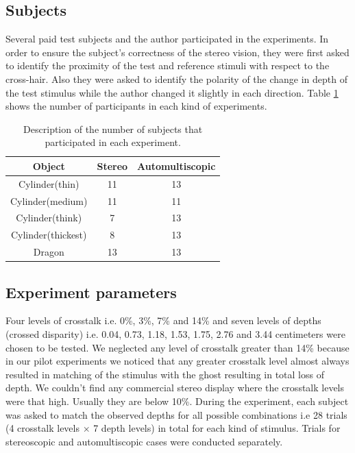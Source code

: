 \subsection{Subjects}
Several paid test subjects and the author participated in the experiments. In order to ensure the subject's correctness of the stereo vision, they were first asked to identify the proximity of the test and reference stimuli with respect to the cross-hair. Also they were asked to identify the polarity of the change in depth of the test stimulus while the author changed it slightly in each direction. Table \ref{tab:agg_subj} shows the number of participants in each kind of experiments.
\begin{table}[ht!]
  \begin{center}
    \caption{Description of the number of subjects that participated in each experiment.}
    \label{tab:agg_subj}
    \begin{tabular}{ccc}
      \toprule
      Object & Stereo  & Automultiscopic\\
      \midrule
      Cylinder(thin) & 11 & 13  \\
      Cylinder(medium) & 11 & 11\\
      Cylinder(think) & 7 & 13\\
      Cylinder(thickest) & 8 & 13 \\
      Dragon & 13 & 13\\
      \bottomrule
    \end{tabular}
  \end{center}
\end{table}

\subsection{Experiment parameters}
Four levels of crosstalk i.e. 0\%, 3\%, 7\% and 14\% and seven levels of depths (crossed disparity) i.e. 0.04, 0.73, 1.18, 1.53, 1.75, 2.76 and 3.44 centimeters were chosen to be tested. We neglected any level of crosstalk greater than 14\% because in our pilot experiments we noticed that any greater crosstalk level almost always resulted in matching of the stimulus with the ghost resulting in total loss of depth. We couldn't find any commercial stereo display where the crosstalk levels were that high. Usually they are below 10\%. During the experiment, each subject was asked to match the observed depths for all possible combinations i.e 28 trials (4 crosstalk levels $\times$ 7 depth levels) in total for each kind of stimulus. Trials for stereoscopic and automultiscopic cases were conducted separately.
\\
